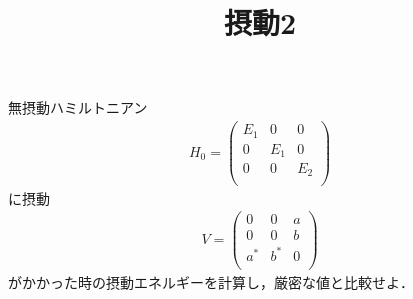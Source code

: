 \documentclass[a4j]{jarticle}
\title{摂動2}
\begin{document}
\maketitle
無摂動ハミルトニアン
\begin{align*}
 H_0=\left(
 \begin{array}{ccc}
  E_1&0 &0 \\
  0  &E_1 &0 \\
  0&0 &E_2 \\
 \end{array}\right)
\end{align*}
 に摂動
\begin{align*}
 V=\left(
 \begin{array}{ccc}
  0&0&a \\
  0  &0 &b \\
  a^*&b^* &0 \\
 \end{array}\right)
\end{align*}
 がかかった時の摂動エネルギーを計算し，厳密な値と比較せよ．
\end{document}
